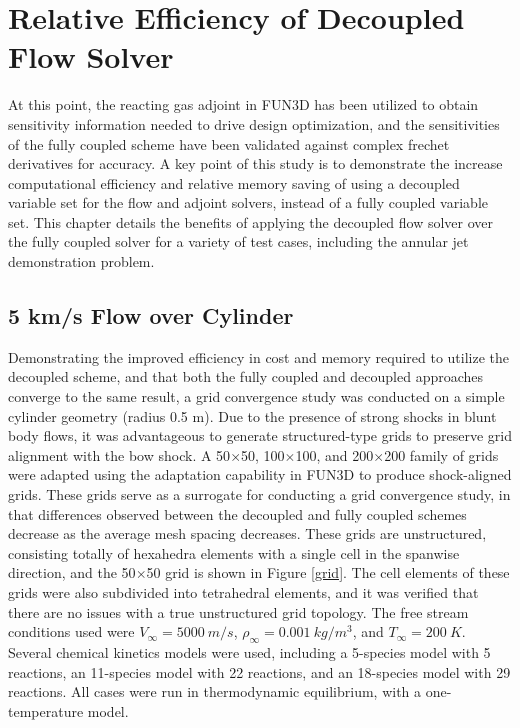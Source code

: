\chapter{Relative Efficiency of Decoupled Flow Solver}
\label{chapter-eight}

At this point, the reacting gas adjoint in FUN3D has been utilized to obtain
sensitivity information needed to drive design optimization, and the
sensitivities of the fully coupled scheme have been validated against complex
frechet derivatives for accuracy.  A key point of this study is to demonstrate
the increase computational efficiency and relative memory saving of using a
decoupled variable set for the flow and adjoint solvers, instead of a fully
coupled variable set.  This chapter details the benefits of applying the
decoupled flow solver over the fully coupled solver for a variety of test cases,
including the annular jet demonstration problem.

\section{5 km/s Flow over Cylinder}
\label{sec:5-kps-cylinder}

Demonstrating the improved efficiency in cost and memory required to utilize the
decoupled scheme, and that both the fully coupled and decoupled approaches
converge to the same result, a grid convergence study was conducted on a simple
cylinder geometry (radius 0.5 m).  Due to the presence of strong shocks in blunt
body flows, it was advantageous to generate structured-type grids to preserve
grid alignment with the bow shock. A 50$\times$50, 100$\times$100, and
200$\times$200 family of grids were adapted using the adaptation capability in
FUN3D\cite{adaptation} to produce shock-aligned grids. These grids serve as a
surrogate for conducting a grid convergence study, in that differences observed
between the decoupled and fully coupled schemes decrease as the average mesh
spacing decreases.  These grids are unstructured, consisting totally of
hexahedra elements with a single cell in the spanwise direction, and the
50$\times$50 grid is shown in Figure \ref{grid}.  The cell elements of these
grids were also subdivided into tetrahedral elements, and it was verified that
there are no issues with a true unstructured grid topology.  The free stream
conditions used were $V_{\infty} = 5000\ m/s$, $\rho_{\infty}=0.001\ kg/m^3$,
and $T_\infty = 200\ K$.  Several chemical kinetics models were used, including
a 5-species model with 5 reactions, an 11-species model with 22 reactions, and
an 18-species model with 29 reactions.  All cases were run in thermodynamic
equilibrium, with a one-temperature model.

